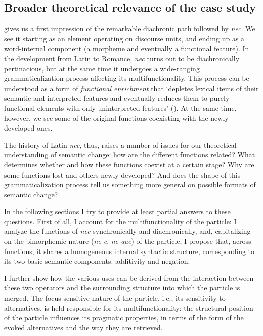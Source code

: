 \documentclass[output=paper,modfonts,nonflat,citecolor=brown,
showindex
]{langsci/langscibook}
\begin{document}
\subsection{Broader theoretical relevance of the case study} \label{theoreticalrelevance}

 gives us a first impression of the remarkable diachronic path followed by {\emph{nec}}. We see it starting as an element operating on discourse units, and ending up as a word-internal component (a morpheme and eventually a functional feature). In the development from Latin to Romance, {\emph{nec}} turns out to be diachronically pertinacious, but at the same time it undergoes a wide-ranging grammaticalization process affecting its multifunctionality. This process can be understood as a form of {\emph{functional enrichment}} that `depletes lexical items of their semantic and interpreted features and eventually reduces them to purely functional elements with only uninterpreted features' (\citealt[73]{Kiparsky15}). At the same time, however, we see some of the original functions coexisting with the newly developed ones.  

The history of Latin {\emph{nec}}, thus, raises a number of issues for our theoretical understanding of semantic change: how are the different functions related? What determines whether and how these functions coexist at a certain stage? Why are some functions lost and others newly developed? And does the shape of this grammaticalization process tell us something more general on possible formats of semantic change?

In the following sections I try to provide at least partial answers to these questions. First of all, I account for the multifunctionality of the particle: I analyze the functions of {\emph{nec}} synchronically and diachronically, and, capitalizing on the bimorphemic nature ({\emph{ne-c}}, {\emph{ne-que}}) of the particle, I propose that, across functions, it shares a homogeneous internal syntactic structure, corresponding to its two basic semantic components: additivity and negation. 

I further show how the various uses can be derived from the interaction between these two operators and the surrounding structure into which the particle is merged. The focus-sensitive nature of the particle, i.e., its sensitivity to alternatives, is held responsible for its multifunctionality: the structural position of the particle influences its pragmatic properties, in terms of the form of the evoked alternatives and the way they are retrieved. 
\end{document}
